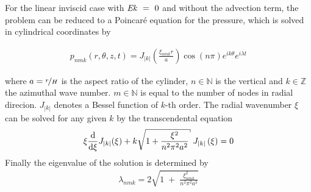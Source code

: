 For the linear inviscid case with $\mbox{\textit{Ek}}~=~0$ and without the advection term, the problem can be reduced to a Poincar\'{e} equation for the pressure,
which is solved in cylindrical coordinates by

\begin{align}
    p_{nmk}(r, \theta, z, t) = J_{|k|}\left(\frac{\xi_{nmk}r}{a} \right)\cos(n\pi)e^{ik\theta}e^{i\lambda t}
\end{align}

where $a=\nicefrac{r}{H}$ is the aspect ratio of the cylinder,
$n\in\mathbb{N}$ is the vertical and $k\in\mathbb{Z}$ the azimuthal wave number.
$m\in\mathbb{N}$ is equal to the number of nodes in radial direcion.
$J_{|k|}$ denotes a Bessel function of $k$-th order.
The radial wavenumber $\xi$  can be solved for any given $k$ by the transcendental equation
\begin{align}
    \xi \frac{\dif}{\dif \xi}J_{|k|}(\xi) + k \sqrt{1 + \frac{\xi^2}{n^2\pi^2a^2}} \; J_{|k|}\left(\xi\right) = 0
\end{align}
Finally the eigenvalue of the solution is determined by
\begin{align}
    \lambda_{nmk} = 2\sqrt{1 \; + \;\frac{ \xi_{nmk}^2}{n^2\pi^2a^2}}
\end{align}

%
%
%



